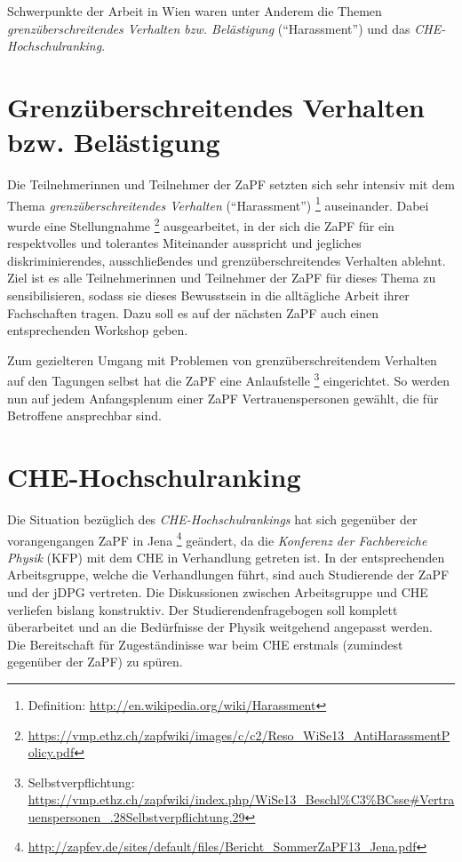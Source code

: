 \documentclass{scrartcl}
\renewcommand{\headrulewidth}{0pt}
\begin{document}
Schwerpunkte der Arbeit in Wien waren unter Anderem die Themen \emph{grenz\"uberschreitendes Verhalten bzw. Bel\"astigung} ("`Harassment"') und das \emph{CHE-Hochschulranking}.

\pagebreak
\renewcommand{\headrulewidth}{0.1pt}
\rhead{\thepage}

\section*{Grenz\"uberschreitendes Verhalten bzw. Bel\"astigung}
Die Teilnehmerinnen und Teilnehmer der ZaPF setzten sich sehr intensiv mit dem Thema \emph{grenz\"uberschreitendes Verhalten} ("`Harassment"') \footnote{Definition: \href{http://en.wikipedia.org/wiki/Harassment}{\url{http://en.wikipedia.org/wiki/Harassment}}} auseinander. Dabei wurde eine Stellungnahme \footnote{\href{https://vmp.ethz.ch/zapfwiki/images/c/c2/Reso_WiSe13_AntiHarassmentPolicy.pdf}{\url{https://vmp.ethz.ch/zapfwiki/images/c/c2/Reso_WiSe13_AntiHarassmentPolicy.pdf}}} ausgearbeitet, in der sich die ZaPF für ein respektvolles und tolerantes Miteinander ausspricht und jegliches diskriminierendes, ausschlie\ss endes und grenz\"uberschreitendes Verhalten ablehnt. Ziel ist es alle Teilnehmerinnen und Teilnehmer der ZaPF für dieses Thema zu sensibilisieren, sodass sie dieses Bewusstsein in die allt\"agliche Arbeit ihrer Fachschaften tragen. Dazu soll es auf der n\"achsten ZaPF auch einen entsprechenden Workshop geben.

Zum gezielteren Umgang mit Problemen von grenz\"uberschreitendem Verhalten auf den Tagungen selbst hat die ZaPF eine Anlaufstelle \footnote{Selbstverpflichtung: \href{https://vmp.ethz.ch/zapfwiki/index.php/WiSe13_Beschl\%C3\%BCsse\#Vertrauenspersonen_.28Selbstverpflichtung.29}{\url{https://vmp.ethz.ch/zapfwiki/index.php/WiSe13_Beschl\%C3\%BCsse\#Vertrauenspersonen_.28Selbstverpflichtung.29}}} eingerichtet. So werden nun auf jedem Anfangsplenum einer ZaPF Vertrauenspersonen gewählt, die für Betroffene ansprechbar sind.

\section*{CHE-Hochschulranking}
Die Situation bez\"uglich des \emph{CHE-Hochschulrankings} hat sich gegenüber der vorangengangen ZaPF in Jena \footnote{\href{http://zapfev.de/sites/default/files/Bericht_SommerZaPF13_Jena.pdf}{\url{http://zapfev.de/sites/default/files/Bericht_SommerZaPF13_Jena.pdf}}} ge\"andert, da die \emph{Konferenz der Fachbereiche Physik} (KFP) mit dem CHE in Verhandlung getreten ist. In der entsprechenden Arbeitsgruppe, welche die Verhandlungen f\"uhrt, sind auch Studierende der ZaPF und der jDPG vertreten. Die Diskussionen zwischen Arbeitsgruppe und CHE verliefen bislang konstruktiv. Der Studierendenfragebogen soll komplett \"uberarbeitet und an die Bed\"urfnisse der Physik weitgehend angepasst werden. Die Bereitschaft f\"ur Zugest\"andinisse war beim CHE erstmals (zumindest gegen\"uber der ZaPF) zu sp\"uren.
\end{document}
